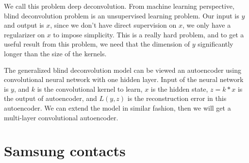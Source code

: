 \documentclass[12pt]{article}
\begin{document}
We call this problem deep deconvolution. From machine learning perspective,  blind deconvolution problem is an unsupervised learning problem. 
Our input is $y$ and output is $x$, since we don't have direct supervision on $x$, we only have a regularizer on $x$ to impose simplicity. 
This is a really hard problem, and to get a useful result from this problem, we need that the dimension of $y$ significantly longer than the size of the kernels. 

 
The generalized blind deconvolution model can be viewed an autoencoder using convolutional neural network with one hidden layer. 
Input of the neural network is $y$, and $k$ is the convolutional kernel to learn, $x$ is the hidden state, $z = k*x$ is the output of autoencoder, 
and $L(y,z)$ is the reconstruction error in this autoencoder. We can extend the model in similar fashion, then we will get a multi-layer convolutional autoencoder.



\section{Samsung contacts}



% 
% 
\end{document}
